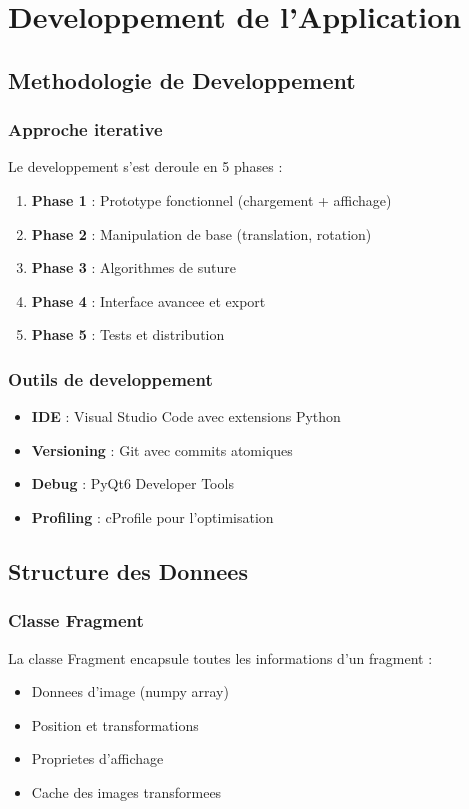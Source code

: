 \documentclass[12pt,a4paper]{article}
\begin{document}
\section{Developpement de l'Application}

\subsection{Methodologie de Developpement}

\subsubsection{Approche iterative}
Le developpement s'est deroule en 5 phases :
\begin{enumerate}
\item \textbf{Phase 1} : Prototype fonctionnel (chargement + affichage)
\item \textbf{Phase 2} : Manipulation de base (translation, rotation)
\item \textbf{Phase 3} : Algorithmes de suture
\item \textbf{Phase 4} : Interface avancee et export
\item \textbf{Phase 5} : Tests et distribution
\end{enumerate}

\subsubsection{Outils de developpement}
\begin{itemize}
\item \textbf{IDE} : Visual Studio Code avec extensions Python
\item \textbf{Versioning} : Git avec commits atomiques
\item \textbf{Debug} : PyQt6 Developer Tools
\item \textbf{Profiling} : cProfile pour l'optimisation
\end{itemize}

\subsection{Structure des Donnees}

\subsubsection{Classe Fragment}
La classe Fragment encapsule toutes les informations d'un fragment :
\begin{itemize}
\item Donnees d'image (numpy array)
\item Position et transformations
\item Proprietes d'affichage
\item Cache des images transformees
\end{itemize}
\end{document}
